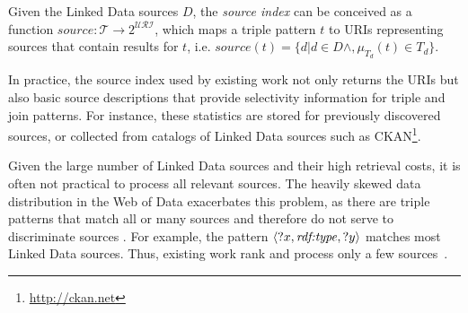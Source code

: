 \begin{definition}
  \label{def:index}
  Given the Linked Data sources $D$, the \emph{source index} can be conceived as a function $source : \mathcal{T} \to 2^\mathcal{URI}$, which maps a triple pattern $t$ to URIs representing sources that contain results for $t$, i.e. $source(t) =
  \{d| d \in D \wedge, \mu_{T_d}(t) \in T_d\}$. 
\end{definition}
%

In practice, the source index used by existing work not only returns the URIs but also basic source descriptions that provide selectivity information for triple and join patterns. For instance, these statistics are stored for previously discovered sources, or collected from catalogs of Linked Data sources such as CKAN\footnote{\url{http://ckan.net}}.

Given the large number of Linked Data sources and their high retrieval costs, it is often not practical to process all relevant sources. The heavily skewed data
distribution in the Web of Data exacerbates this problem, as there are
triple patterns that match all or many sources and therefore do not
serve to discriminate sources \cite{ladwig_linked_2010}. For example, 
the pattern $\langle ?x, \mbox{\emph{rdf:type}}, ?y \rangle$ matches most Linked Data sources. Thus, existing work rank and process only a few sources~\cite{harth_data_2010,ladwig_linked_2010}.


